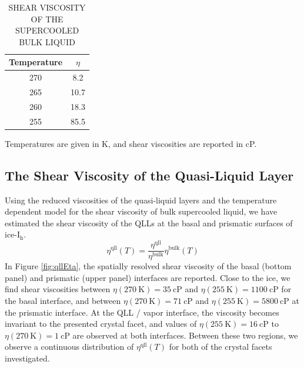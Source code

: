 \begin{table}[h] \centering \caption{SHEAR VISCOSITY OF THE
    SUPERCOOLED BULK LIQUID\label{tab:bulkVisco}}
\begin{threeparttable}
\begin{tabular}{cc}
\hline
\hline
 Temperature & $\eta$ \\
\hline
270 & 8.2 \\
265 & 10.7 \\
260 & 18.3  \\
255 & 85.5 \\
\hline
\hline
\end{tabular}
\begin{tablenotes}
      \small
    \item Temperatures are given in K, and shear viscosities are
      reported in cP.
\end{tablenotes}
\end{threeparttable}
\end{table}


\subsection{The Shear Viscosity of the Quasi-Liquid Layer}
Using the reduced viscosities of the quasi-liquid layers and the
temperature dependent model for the shear viscosity of bulk
supercooled liquid, we have estimated the shear viscosity of the QLLs
at the basal and prismatic surfaces of ice-I$_\mathrm{h}$.
\begin{equation}\label{eq:qllT}
\eta^{\mathrm{qll}}(T) = \frac{\eta^{\mathrm{qll}}}{\eta^{\mathrm{bulk}}}\eta^{\mathrm{bulk}}(T)
\end{equation}
In Figure \ref{fig:qllEta}, the spatially resolved shear viscosity of
the basal (bottom panel) and prismatic (upper panel) interfaces are
reported. Close to the ice, we find shear viscosities between
$\eta(270~\mathrm{K}) = 35~\mathrm{cP}$ and
$\eta(255~\mathrm{K}) = 1100~\mathrm{cP}$ for the basal interface, and
between $\eta(270~\mathrm{K}) = 71~\mathrm{cP}$ and
$\eta(255~\mathrm{K}) = 5800~\mathrm{cP}$ at the prismatic
interface. At the QLL / vapor interface, the viscosity becomes
invariant to the presented crystal facet, and values of
$\eta(255~\mathrm{K}) = 16~\mathrm{cP}$ to
$\eta(270~\mathrm{K}) = 1~\mathrm{cP}$ are observed at both
interfaces. Between these two regions, we observe a continuous
distribution of $\eta^{\mathrm{qll}}(T)$ for both of the crystal
facets investigated. 

